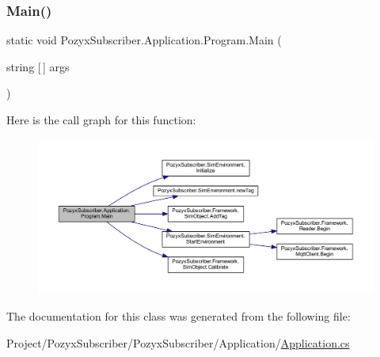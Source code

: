 \subsubsection{\texorpdfstring{Main()}{Main()}}
{\footnotesize\ttfamily static void Pozyx\+Subscriber.\+Application.\+Program.\+Main (\begin{DoxyParamCaption}\item[{string \mbox{[}$\,$\mbox{]}}]{args }\end{DoxyParamCaption})\hspace{0.3cm}{\ttfamily [static]}}

Here is the call graph for this function\+:
\nopagebreak
\begin{figure}[H]
\begin{center}
\leavevmode
\includegraphics[width=350pt]{class_pozyx_subscriber_1_1_application_1_1_program_a35d33857544887b054b88bb37aeff83c_cgraph}
\end{center}
\end{figure}


The documentation for this class was generated from the following file\+:\begin{DoxyCompactItemize}
\item 
Project/\+Pozyx\+Subscriber/\+Pozyx\+Subscriber/\+Application/\hyperlink{_application_8cs}{Application.\+cs}\end{DoxyCompactItemize}
